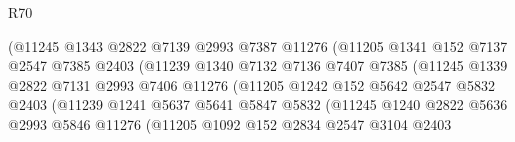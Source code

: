 \begin{lexlean}{R70}
\begin{coremodule}
                                  (@11245
                                    @1343
                                    @2822
                                    @7139
                                    @2993
                                    @7387
                                    @11276
                                    (@11205
                                      @1341
                                      @152
                                      @7137
                                      @2547
                                      @7385
                                      @2403
                                      (@11239
                                        @1340
                                        @7132
                                        @7136
                                        @7407
                                        @7385
                                        (@11245
                                          @1339
                                          @2822
                                          @7131
                                          @2993
                                          @7406
                                          @11276
                                          (@11205
                                            @1242
                                            @152
                                            @5642
                                            @2547
                                            @5832
                                            @2403
                                            (@11239
                                              @1241
                                              @5637
                                              @5641
                                              @5847
                                              @5832
                                              (@11245
                                                @1240
                                                @2822
                                                @5636
                                                @2993
                                                @5846
                                                @11276
                                                (@11205
                                                  @1092
                                                  @152
                                                  @2834
                                                  @2547
                                                  @3104
                                                  @2403

\end{coremodule}
\end{lexlean}
